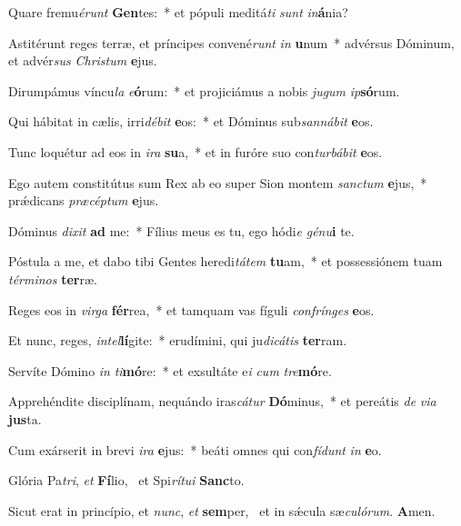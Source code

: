 \item Quare fremu\textit{é}\textit{runt} \textbf{Gen}tes:~* et pópuli meditá\textit{ti} \textit{sunt} \textit{in}\textbf{á}nia?
\item Astitérunt reges terræ, et príncipes convené\textit{runt} \textit{in} \textbf{u}num~* advérsus Dóminum, et advér\textit{sus} \textit{Chris}\textit{tum} \textbf{e}jus.
\item Dirumpámus víncu\textit{la} \textit{e}\textbf{ó}rum:~* et projiciámus a nobis \textit{ju}\textit{gum} \textit{ip}\textbf{só}rum.
\item Qui hábitat in cælis, irri\textit{dé}\textit{bit} \textbf{e}os:~* et Dóminus sub\textit{san}\textit{ná}\textit{bit} \textbf{e}os.
\item Tunc loquétur ad eos in \textit{i}\textit{ra} \textbf{su}a,~* et in furóre suo con\textit{tur}\textit{bá}\textit{bit} \textbf{e}os.
\item Ego autem constitútus sum Rex ab eo super Sion montem \textit{sanc}\textit{tum} \textbf{e}jus,~* prǽdicans \textit{præ}\textit{cép}\textit{tum} \textbf{e}jus.
\item Dóminus \textit{di}\textit{xit} \textbf{ad} me:~* Fílius meus es tu, ego hódi\textit{e} \textit{gé}\textit{nu}\textbf{i} te.
\item Póstula a me, et dabo tibi Gentes heredi\textit{tá}\textit{tem} \textbf{tu}am,~* et possessiónem tuam \textit{tér}\textit{mi}\textit{nos} \textbf{ter}ræ.
\item Reges eos in \textit{vir}\textit{ga} \textbf{fér}rea,~* et tamquam vas fíguli \textit{con}\textit{frín}\textit{ges} \textbf{e}os.
\item Et nunc, reges, \textit{in}\textit{tel}\textbf{lí}gite:~* erudímini, qui ju\textit{di}\textit{cá}\textit{tis} \textbf{ter}ram.
\item Servíte Dómino \textit{in} \textit{ti}\textbf{mó}re:~* et exsultáte e\textit{i} \textit{cum} \textit{tre}\textbf{mó}re.
\item Apprehéndite disciplínam, nequándo iras\textit{cá}\textit{tur} \textbf{Dó}minus,~* et pereátis \textit{de} \textit{vi}\textit{a} \textbf{jus}ta.
\item Cum exárserit in brevi \textit{i}\textit{ra} \textbf{e}jus:~* beáti omnes qui con\textit{fí}\textit{dunt} \textit{in} \textbf{e}o.
\item Glória Pa\textit{tri}, \textit{et} \textbf{Fí}lio,~\psstar{} et Spi\textit{rí}\textit{tu}\textit{i} \textbf{Sanc}to.
\item Sicut erat in princípio, et \textit{nunc}, \textit{et} \textbf{sem}per,~\psstar{} et in sǽcula sæ\textit{cu}\textit{ló}\textit{rum}. \textbf{A}men.
